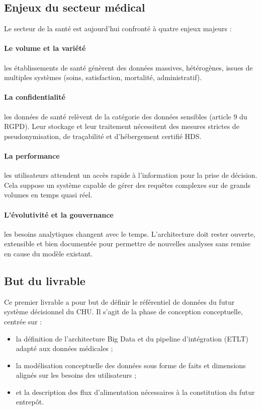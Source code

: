 \documentclass[12pt,a4paper]{article}
\begin{document}
\subsection{Enjeux du secteur médical}

Le secteur de la santé est aujourd'hui confronté à quatre enjeux majeurs :

\paragraph{Le volume et la variété} les établissements de santé génèrent des données massives, hétérogènes, issues de multiples systèmes (soins, satisfaction, mortalité, administratif).

\paragraph{La confidentialité} les données de santé relèvent de la catégorie des données sensibles (article 9 du RGPD). Leur stockage et leur traitement nécessitent des mesures strictes de pseudonymisation, de traçabilité et d'hébergement certifié HDS.

\paragraph{La performance} les utilisateurs attendent un accès rapide à l'information pour la prise de décision. Cela suppose un système capable de gérer des requêtes complexes sur de grands volumes en temps quasi réel.

\paragraph{L'évolutivité et la gouvernance} les besoins analytiques changent avec le temps. L'architecture doit rester ouverte, extensible et bien documentée pour permettre de nouvelles analyses sans remise en cause du modèle existant.

\subsection{But du livrable}

Ce premier livrable a pour but de définir le référentiel de données du futur système décisionnel du CHU. Il s'agit de la phase de conception conceptuelle, centrée sur :

\begin{itemize}[leftmargin=*]
    \item la définition de l'architecture Big Data et du pipeline d'intégration (ETLT) adapté aux données médicales ;
    \item la modélisation conceptuelle des données sous forme de faits et dimensions alignés sur les besoins des utilisateurs ;
    \item et la description des flux d'alimentation nécessaires à la constitution du futur entrepôt.
\end{itemize}
\end{document}
